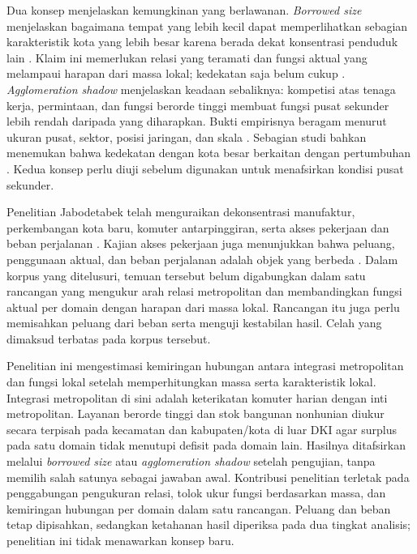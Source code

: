 \documentclass[12pt,a4paper,oneside,openany,indonesian]{report}
\begin{document}
Dua konsep menjelaskan kemungkinan yang berlawanan. \emph{Borrowed size} menjelaskan bagaimana tempat yang lebih kecil dapat memperlihatkan sebagian karakteristik kota yang lebih besar karena berada dekat konsentrasi penduduk lain \parencite{alonso1973}. Klaim ini memerlukan relasi yang teramati dan fungsi aktual yang melampaui harapan dari massa lokal; kedekatan saja belum cukup \parencite{meijersburger2017,meijersetal2016}. \emph{Agglomeration shadow} menjelaskan keadaan sebaliknya: kompetisi atas tenaga kerja, permintaan, dan fungsi berorde tinggi membuat fungsi pusat sekunder lebih rendah daripada yang diharapkan. Bukti empirisnya beragam menurut ukuran pusat, sektor, posisi jaringan, dan skala \parencite{volgmannrusche2020,yangzhudu2022,zhenshilu2023}. Sebagian studi bahkan menemukan bahwa kedekatan dengan kota besar berkaitan dengan pertumbuhan \parencite{partridgeetal2009,sunding2016}. Kedua konsep perlu diuji sebelum digunakan untuk menafsirkan kondisi pusat sekunder.

Penelitian Jabodetabek telah menguraikan dekonsentrasi manufaktur, perkembangan kota baru, komuter antarpinggiran, serta akses pekerjaan dan beban perjalanan \parencite{hudalahetal2013,firmanfahmi2017,sadewoetal2023,aritenang2022,andani2025}. Kajian akses pekerjaan juga menunjukkan bahwa peluang, penggunaan aktual, dan beban perjalanan adalah objek yang berbeda \parencite{andani2021}. Dalam korpus yang ditelusuri, temuan tersebut belum digabungkan dalam satu rancangan yang mengukur arah relasi metropolitan dan membandingkan fungsi aktual per domain dengan harapan dari massa lokal. Rancangan itu juga perlu memisahkan peluang dari beban serta menguji kestabilan hasil. Celah yang dimaksud terbatas pada korpus tersebut.

Penelitian ini mengestimasi kemiringan hubungan antara integrasi metropolitan dan fungsi lokal setelah memperhitungkan massa serta karakteristik lokal. Integrasi metropolitan di sini adalah keterikatan komuter harian dengan inti metropolitan. Layanan berorde tinggi dan stok bangunan nonhunian diukur secara terpisah pada kecamatan dan kabupaten/kota di luar DKI agar surplus pada satu domain tidak menutupi defisit pada domain lain. Hasilnya ditafsirkan melalui \emph{borrowed size} atau \emph{agglomeration shadow} setelah pengujian, tanpa memilih salah satunya sebagai jawaban awal. Kontribusi penelitian terletak pada penggabungan pengukuran relasi, tolok ukur fungsi berdasarkan massa, dan kemiringan hubungan per domain dalam satu rancangan. Peluang dan beban tetap dipisahkan, sedangkan ketahanan hasil diperiksa pada dua tingkat analisis; penelitian ini tidak menawarkan konsep baru.
\end{document}
